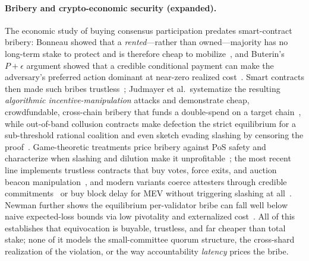 

\paragraph{Bribery and crypto-economic security (expanded).}
The economic study of buying consensus participation predates smart-contract bribery: Bonneau showed
that a \emph{rented}---rather than owned---majority has no long-term stake to protect and is therefore
cheap to mobilize~\cite{bonneau2016rent}, and Buterin's $P{+}\epsilon$ argument showed that a credible
conditional payment can make the adversary's preferred action dominant at near-zero realized
cost~\cite{buterin2015pepsilon}. Smart contracts then made such bribes
trustless~\cite{mccorry2018smart,winzer2019temporary}; Judmayer et al.\ systematize the resulting
\emph{algorithmic incentive-manipulation} attacks and demonstrate cheap, crowdfundable, cross-chain
bribery that funds a double-spend on a target chain~\cite{judmayer2021sok,judmayer2021paytowin}, while
out-of-band collusion contracts make defection the strict equilibrium for a sub-threshold rational
coalition and even sketch evading slashing by censoring the proof~\cite{zhang2023outofband}.
Game-theoretic treatments price bribery against PoS safety and characterize when slashing and dilution
make it unprofitable~\cite{karakostas2024bribing}; the most recent line implements trustless contracts
that buy votes, force exits, and auction beacon manipulation~\cite{sookitoth2025bribers,kelkar2025omerta,austgen2025liquefaction},
and modern variants coerce attesters through credible commitments~\cite{sarenche2024commitment} or
buy block delay for MEV without triggering slashing at all~\cite{yang2024bride}. Newman further shows
the equilibrium per-validator bribe can fall well below naive expected-loss bounds via low
pivotality and externalized cost~\cite{newman2023decentralization}. All of this establishes that
equivocation is buyable, trustless, and far cheaper than total stake; none of it models the
small-committee quorum structure, the cross-shard realization of the violation, or the way
accountability \emph{latency} prices the bribe.

